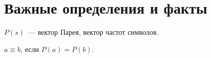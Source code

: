 \section{Важные определения и факты}

$P(s)$~--- вектор Парея, вектор частот символов.

$a \equiv b$, если $P(a) = P(b)$.
